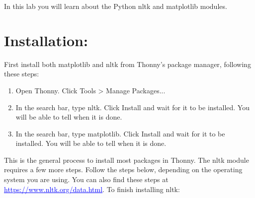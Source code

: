 \documentclass[11pt, letterpaper, onecolumn, oneside, final]{article}
\begin{document}
\maketitle

 In this lab you will learn about the Python {\consolas nltk} and {\consolas matplotlib} modules.\\
 
\section{Installation:}
    First install both {\consolas matplotlib} and {\consolas nltk} from Thonny's package manager, following these steps:
\begin{enumerate}
    \item Open Thonny. Click {\consolas Tools > Manage Packages...}
    \item In the search bar, type {\consolas nltk}. Click {\consolas Install} and wait for it to be installed. You will be able to tell when it is done.
    \item In the search bar, type {\consolas matplotlib}. Click {\consolas Install} and wait for it to be installed. You will be able to tell when it is done.
\end{enumerate}
This is the general process to install most packages in Thonny. The {\consolas nltk} module requires a few more steps. Follow the steps below, depending on the operating system you are using. You can also find these steps at
\textcolor{blue}{\underline{https://www.nltk.org/data.html}}. To finish installing {\consolas nltk}:
\end{document}
